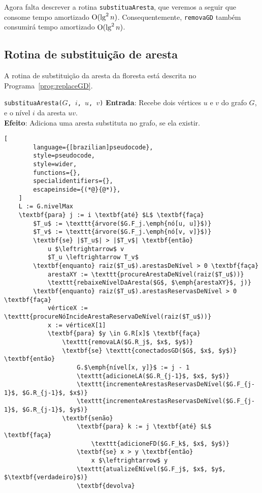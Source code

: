 Agora falta descrever a rotina \texttt{substituaAresta}, que veremos a seguir que consome tempo amortizado $\mathrm{O}(\lg^2 n)$. Consequentemente, \texttt{removaGD} também consumirá tempo amortizado $\mathrm{O}(\lg^2 n)$.

\subsection{Rotina de substituição de aresta}
\label{sec:replace-edge}

A rotina de substituição da aresta da floresta está descrita no Programa~\ref{prog:replaceGD}.

\begin{programruledcaption}{\texttt{substituaAresta($G$, $i$, $u$, $v$)} \label{prog:replaceGD}}
    \noindent\textbf{Entrada}: Recebe dois vértices $u$ e $v$ do grafo $G$, e o nível $i$ da aresta $uv$. \\
    \noindent\textbf{Efeito}: Adiciona uma aresta substituta no grafo, se ela existir.
    \vspace{-0.5\baselineskip}
    \begin{lstlisting}[
        language={[brazilian]pseudocode},
        style=pseudocode,
        style=wider,
        functions={},
        specialidentifiers={},
        escapeinside={(*@}{@*)},
    ]
    L := G.nivelMax
    \textbf{para} j := i \textbf{até} $L$ \textbf{faça}
        $T_u$ := \texttt{árvore($G.F_j.\emph{nó[u, u]}$)}
        $T_v$ := \texttt{árvore($G.F_j.\emph{nó[v, v]}$)}    
        \textbf{se} |$T_u$| > |$T_v$| \textbf{então}
            u $\leftrightarrow$ v
            $T_u \leftrightarrow T_v$
        \textbf{enquanto} raiz($T_u$).arestasDeNível > 0 \textbf{faça} 
            arestaXY := \texttt{procureArestaDeNível(raiz($T_u$))}
            \texttt{rebaixeNívelDaAresta($G$, $\emph{arestaXY}$, j)}
        \textbf{enquanto} raiz($T_u$).arestasReservasDeNível > 0     \textbf{faça}
            vérticeX := \texttt{procureNóIncideArestaReservaDeNível(raiz($T_u$))}
            x := vérticeX[1]
            \textbf{para} $y \in G.R[x]$ \textbf{faça}
                \texttt{removaLA($G.R_j$, $x$, $y$)} 
                \textbf{se} \texttt{conectadosGD($G$, $x$, $y$)} \textbf{então} 
                    G.$\emph{nível[x, y]}$ := j - 1
                    \texttt{adicioneLA($G.R_{j-1}$, $x$, $y$)}
                    \texttt{incrementeArestasReservasDeNível($G.F_{j-1}$, $G.R_{j-1}$, $x$)}
                    \texttt{incrementeArestasReservasDeNível($G.F_{j-1}$, $G.R_{j-1}$, $y$)}
                \textbf{senão}
                    \textbf{para} k := j \textbf{até} $L$ \textbf{faça}
                        \texttt{adicioneFD($G.F_k$, $x$, $y$)}
                    \textbf{se} x > y \textbf{então}
                        x $\leftrightarrow$ y
                    \texttt{atualizeÉNível($G.F_j$, $x$, $y$, $\textbf{verdadeiro}$)}
                    \textbf{devolva}
    \end{lstlisting}
    \vspace{-0.5\baselineskip}
\end{programruledcaption}

